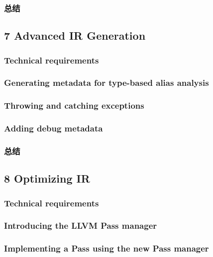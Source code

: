 \documentclass[11pt,a4paper,UTF8]{ctexart}
\begin{document}
		\subsubsection{总结}
	\subsection{7 Advanced IR Generation}
		\subsubsection{Technical requirements}
		\subsubsection{Generating metadata for type-based alias analysis}
		\subsubsection{Throwing and catching exceptions}
		\subsubsection{Adding debug metadata}
		\subsubsection{总结}
	\subsection{8 Optimizing IR}
		\subsubsection{Technical requirements}
		\subsubsection{Introducing the LLVM Pass manager}
		\subsubsection{Implementing a Pass using the new Pass manager}
\end{document}

